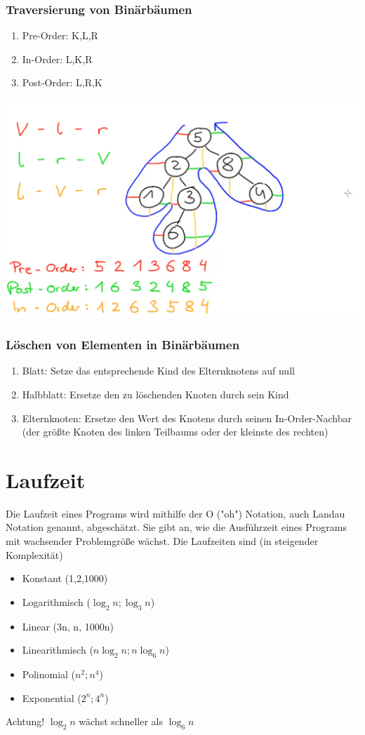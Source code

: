 \documentclass{article}
\begin{document}
\subsubsection*{Traversierung von Binärbäumen}
\begin{enumerate}
    \item Pre-Order: K,L,R
    \item In-Order:  L,K,R
    \item Post-Order: L,R,K
\end{enumerate}
\includegraphics[width=\textwidth,keepaspectratio]{snapshot.png}

\subsubsection*{Löschen von Elementen in Binärbäumen}
\begin{enumerate}
    \item Blatt: Setze das entsprechende Kind des Elternknotens auf null
    \item Halbblatt: Ersetze den zu löschenden Knoten durch sein Kind
    \item Elternknoten: Ersetze den Wert des Knotens durch seinen In-Order-Nachbar 
            (der größte Knoten des linken Teilbaums oder der kleinste des rechten)
\end{enumerate}

\section*{Laufzeit}
Die Laufzeit eines Programs wird mithilfe der O ("oh") Notation, auch Landau Notation genannt, abgeschätzt.
Sie gibt an, wie die Ausführzeit eines Programs mit wachsender Problemgröße wächst.
Die Laufzeiten sind (in steigender Komplexität)
\begin{itemize}
    \item Konstant (1,2,1000)
    \item Logarithmisch ($\log_2 n; \log_3 n$)
    \item Linear (3n, n, 1000n)
    \item Linearithmisch ($n \log_2 n; n \log_6 n$)
    \item Polinomial ($n^2;n^4$)
    \item Exponential ($2^n;4^n$)
\end{itemize}
Achtung! $\log_2 n$ wächst schneller als $\log_6 n$
\end{document}
